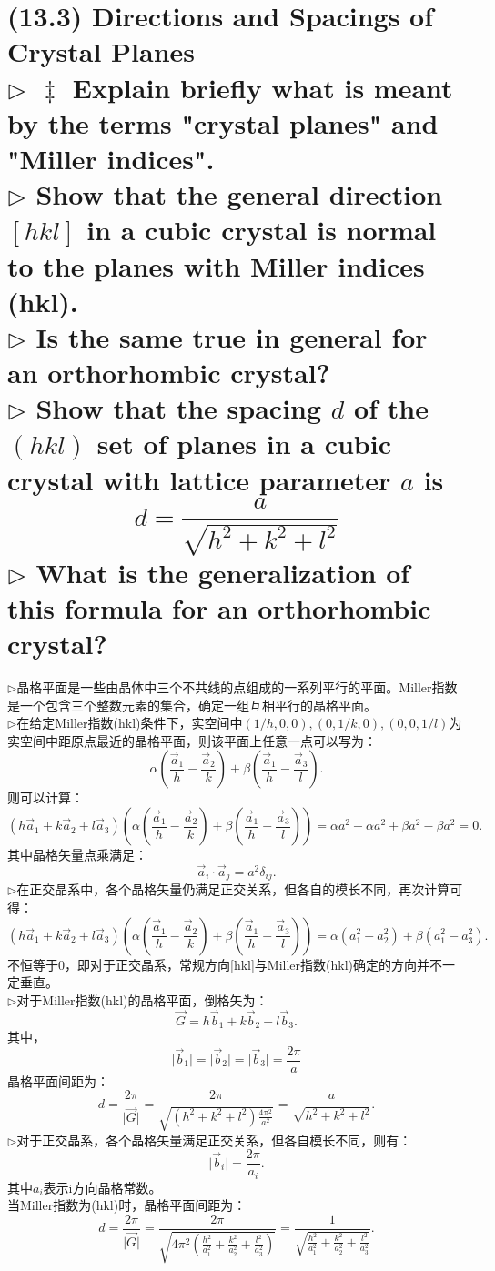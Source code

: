 \documentclass[reqno,a4paper,12pt]{amsart}
\begin{document}
\section{\textbf{(13.3) Directions and Spacings of Crystal Planes}\\
$\triangleright ~~ \ddagger$ Explain briefly what is meant by the terms "crystal planes" and "Miller indices". \\
$\triangleright$ Show that the general direction $[hkl]$ in a cubic crystal is normal to the planes with Miller indices (hkl). \\
$\triangleright$ Is the same true in general for an orthorhombic crystal? \\
$\triangleright$ Show that the spacing $d$ of the $(hkl)$ set of planes in a cubic crystal with lattice parameter $a$ is 
\[
	d = \frac{a}{\sqrt{h^2+k^2+l^2}}
\]
$\triangleright$ What is the generalization of this formula for an orthorhombic crystal?
}
\begin{tcolorbox}[breakable, colback = black!5!white, colframe = black]
$\triangleright$晶格平面是一些由晶体中三个不共线的点组成的一系列平行的平面。Miller指数是一个包含三个整数元素的集合，确定一组互相平行的晶格平面。 \\
$\triangleright$在给定Miller指数(hkl)条件下，实空间中$(1/h, 0, 0), (0, 1/k, 0), (0, 0, 1/l)$为实空间中距原点最近的晶格平面，则该平面上任意一点可以写为：
\[
	\alpha \left( \frac{\vec{a}_1}{h} - \frac{\vec{a}_2}{k} \right) + \beta \left( \frac{\vec{a}_1}{h} - \frac{\vec{a}_3}{l} \right).
\]
则可以计算：
\[
	(h\vec{a}_1 + k\vec{a}_2 + l\vec{a}_3)\left( \alpha \left( \frac{\vec{a}_1}{h} - \frac{\vec{a}_2}{k} \right) + \beta \left( \frac{\vec{a}_1}{h} - \frac{\vec{a}_3}{l} \right) \right) = \alpha a^2 - \alpha a^2 + \beta a^2 - \beta a^2 = 0.
\]
其中晶格矢量点乘满足：
\[
	\vec{a}_i \cdot \vec{a}_j = a^2\delta_{ij}.
\]
$\triangleright$在正交晶系中，各个晶格矢量仍满足正交关系，但各自的模长不同，再次计算可得：
\[
	(h\vec{a}_1 + k\vec{a}_2 + l\vec{a}_3)\left( \alpha \left( \frac{\vec{a}_1}{h} - \frac{\vec{a}_2}{k} \right) + \beta \left( \frac{\vec{a}_1}{h} - \frac{\vec{a}_3}{l} \right) \right) = \alpha (a_1^2 - a_2^2) + \beta (a_1^2 - a_3^2).
\]
不恒等于0，即对于正交晶系，常规方向[hkl]与Miller指数(hkl)确定的方向并不一定垂直。 \\
$\triangleright$对于Miller指数(hkl)的晶格平面，倒格矢为：
\[
	\vec{G} = h\vec{b}_1 + k\vec{b}_2 + l\vec{b}_3.
\]
其中，
\[
\vert \vec{b}_1 \vert = \vert \vec{b}_2 \vert = \vert \vec{b}_3 \vert = \frac{2\pi}{a}
\]
晶格平面间距为：
\[
	d = \frac{2\pi}{\vert \vec{G} \vert} = \frac{2\pi}{\sqrt{(h^2+k^2+l^2)\frac{4\pi^2}{a^2}}} = \frac{a}{\sqrt{h^2+k^2+l^2}}. 
\]
$\triangleright$对于正交晶系，各个晶格矢量满足正交关系，但各自模长不同，则有：
\[
	\vert \vec{b}_i \vert = \frac{2\pi}{a_i}.
\]
其中$a_i$表示i方向晶格常数。 \\
当Miller指数为(hkl)时，晶格平面间距为：
\[
	d = \frac{2\pi}{\vert \vec{G} \vert} = \frac{2\pi}{\sqrt{4\pi^2 \left( \frac{h^2}{a_1^2} + \frac{k^2}{a_2^2} + \frac{l^2}{a_3^2} \right)}} = \frac{1}{\sqrt{\frac{h^2}{a_1^2} + \frac{k^2}{a_2^2} + \frac{l^2}{a_3^2}}}.
\]
\end{tcolorbox}
\end{document}
